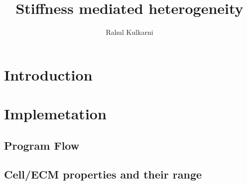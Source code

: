 \documentclass[a4paper,10pt]{article}
\title{Stiffness mediated heterogeneity}
\author{Rahul Kulkarni}
\begin{document}
\maketitle

\begin{abstract}

\end{abstract}

\section{Introduction}
\section{Implemetation}
\subsection{Program Flow}
\subsection{Cell/ECM properties and their range}

\end{document}
